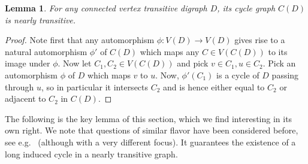 \documentclass[english,11pt]{article}
\newtheorem{lemma}[theorem]{Lemma}
\theoremstyle{definition}
\numberwithin{equation}{section}
\numberwithin{figure}{section}
\begin{document}
\begin{lemma}\label{lem:near-transitivyity-of-cycle-graphs}
	For any connected vertex transitive digraph $D$, its cycle graph $C(D)$ is nearly transitive.
\end{lemma}
\begin{proof}
	Note first that any automorphism $\phi:V(D) \to V(D)$ gives rise to a natural automorphism $\phi'$ of $C(D)$ which maps any $C \in V(C(D))$ to its image under $\phi$. 
	Now let $C_1,C_2 \in V(C(D))$ and pick $v \in C_1, u \in C_2$. Pick an automorphism $\phi$ of $D$ which maps $v$ to $u$. Now, $\phi'(C_1)$ is a cycle of $D$ passing through $u$, so in particular it intersects $C_2$ and is hence either equal to $C_2$ or adjacent to $C_2$ in $C(D)$.
\end{proof}

The following is the key lemma of this section, which we find interesting in its own right. We note that questions of similar flavor have been considered before, see e.g.\ \cite{closing-cycle,milanivc2025closing} (although with a very different focus). It guarantees the existence of a long induced cycle in a nearly transitive graph.
\end{document}
